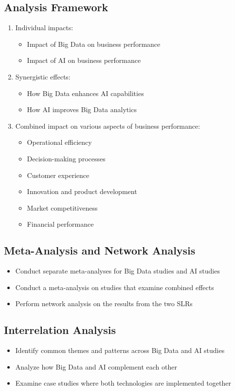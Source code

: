 \documentclass{article}
\theoremstyle{mytheoremstyle}
\theoremstyle{mytheoremstyle}
\theoremstyle{myproblemstyle}
\begin{document}
\subsection{Analysis Framework}
\begin{enumerate}[label=\alph*)]
    \item Individual impacts:
    \begin{itemize}
        \item Impact of Big Data on business performance
        \item Impact of AI on business performance
    \end{itemize}
    
    \item Synergistic effects:
    \begin{itemize}
        \item How Big Data enhances AI capabilities
        \item How AI improves Big Data analytics
    \end{itemize}
    
    \item Combined impact on various aspects of business performance:
    \begin{itemize}
        \item Operational efficiency
        \item Decision-making processes
        \item Customer experience
        \item Innovation and product development
        \item Market competitiveness
        \item Financial performance
    \end{itemize}
\end{enumerate}

\subsection{Meta-Analysis and Network Analysis}
\begin{itemize}
    \item Conduct separate meta-analyses for Big Data studies and AI studies
    \item Conduct a meta-analysis on studies that examine combined effects
    \item Perform network analysis on the results from the two SLRs
\end{itemize}

\subsection{Interrelation Analysis}
\begin{itemize}
    \item Identify common themes and patterns across Big Data and AI studies
    \item Analyze how Big Data and AI complement each other
    \item Examine case studies where both technologies are implemented together
\end{itemize}
\end{document}
